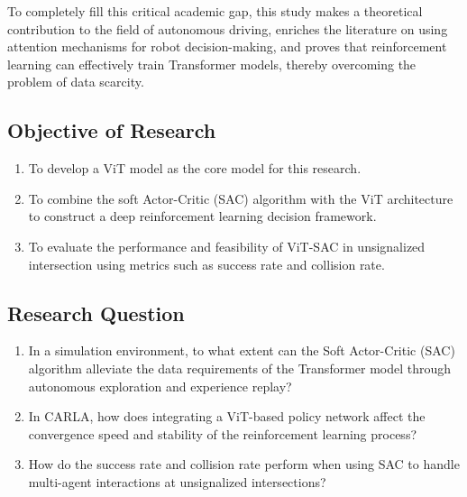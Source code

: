     To completely fill this critical academic gap, this study makes a theoretical contribution to the field of autonomous driving, enriches the literature on using attention mechanisms for robot decision-making, and proves that reinforcement learning can effectively train Transformer models, thereby overcoming the problem of data scarcity.

    \subsection{Objective of Research}
    \begin{enumerate}
        \item To develop a ViT model as the core model for this research. 
        \item To combine the soft Actor-Critic (SAC) algorithm with the ViT architecture to construct a deep reinforcement learning decision framework. 
        \item To evaluate the performance and feasibility of ViT-SAC in unsignalized intersection using metrics such as success rate and collision rate.
    \end{enumerate}

    \subsection{Research Question}
    \begin{enumerate}
        \item In a simulation environment, to what extent can the Soft Actor-Critic (SAC) algorithm alleviate the data requirements of the Transformer model through autonomous exploration and experience replay?
        \item In CARLA, how does integrating a ViT-based policy network affect the convergence speed and stability of the reinforcement learning process?
        \item How do the success rate and collision rate perform when using SAC to handle multi-agent interactions at unsignalized intersections?
    \end{enumerate}
